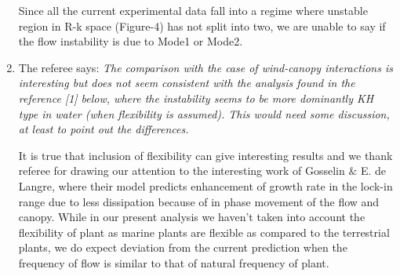 \documentclass[letterpaper,10pt]{article}
\begin{document}
\begin{enumerate}
Since all the current experimental data fall into a regime where unstable region in R-k space (Figure-4) has not split into two, we are unable to say if the flow instability is due to Mode1 or Mode2. 

\item The referee says:
\textit{
The comparison with the case of wind-canopy interactions is interesting but does not seem consistent with the analysis found in the reference [1]  below, where the instability seems to be more dominantly KH type in water  (when flexibility is assumed).  This would need some discussion, at least to point out the differences.
}

It is true that inclusion of flexibility can give interesting results and we thank referee for drawing our attention to the interesting work of Gosselin $\&$ E. de Langre, where their model predicts enhancement of growth rate in the lock-in range due to less dissipation because of in phase movement of the flow and canopy. While in our present analysis we haven't taken into account the flexibility of plant as marine plants are flexible as compared to the terrestrial plants, we do expect deviation from the current prediction when the frequency of flow is similar to that of natural frequency of plant.  

\end{enumerate}
\end{document}
